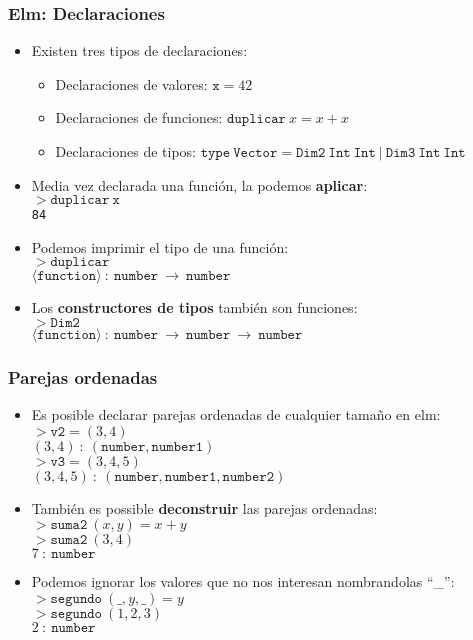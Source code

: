 \documentclass{beamer}
\begin{document}
\begin{frame}
\frametitle{Elm: Declaraciones}
\begin{itemize}
    \item{Existen tres tipos de declaraciones:
    \begin{itemize}
        \item{Declaraciones de valores: $\mathtt{x}=42$}
        \item{Declaraciones de funciones: $\mathtt{duplicar}\ x=x+x$}
        \item{Declaraciones de tipos: $\mathtt{type\ Vector}=\mathtt{Dim2\ Int\ Int}\ |\ \mathtt{Dim3\ Int\ Int}$}
    \end{itemize}
    }
    \item{Media vez declarada una funci\'on, la podemos {\bf aplicar}:\\
        $\mathtt{> duplicar\ x}$ \\
        \texttt{84}
    }
    \item{Podemos imprimir el tipo de una funci\'on:\\
    $>\mathtt{duplicar}$\\
    $\langle\mathtt{function}\rangle \ :\ \mathtt{number}\ \rightarrow\ \mathtt{number}$
    }
    \item{Los {\bf constructores de tipos} tambi\'en son funciones:\\
    $>\mathtt{Dim2}$ \\
    $\langle\mathtt{function}\rangle \ :\ \mathtt{number}\ \rightarrow\ \mathtt{number}\ \rightarrow\ \mathtt{number}$
    }
\end{itemize}
\end{frame}

\begin{frame}
\frametitle{Parejas ordenadas}
\begin{itemize}
    \item{Es posible declarar parejas ordenadas de cualquier tama\~no en elm:\\
    $>\mathtt{v2} = (3,4)$\\
    $(3,4)\ :\ (\mathtt{number},\mathtt{number1})$\\
    $>\mathtt{v3} = (3,4,5)$\\
    $(3,4,5)\ :\ (\mathtt{number},\mathtt{number1},\mathtt{number2})$
    }
    \item{Tambi\'en es possible {\bf deconstruir} las parejas ordenadas:\\
    $>\mathtt{suma2}\ (x,y) = x + y$\\
    $>\mathtt{suma2}\ (3,4)$\\
    $7\ :\ \mathtt{number}$
    }
    \item{Podemos ignorar los valores que no nos interesan nombrandolas ``\_'':\\
    $>\mathtt{segundo}\ (\_,y,\_)=y$\\
    $>\mathtt{segundo}\ (1,2,3)$\\
    $2\ :\ \mathtt{number}$}
\end{itemize}
\end{frame}
\end{document}
